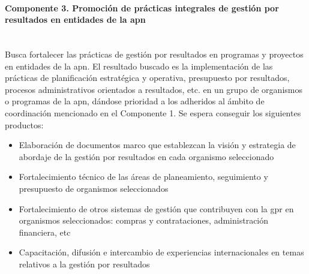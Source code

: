 \paragraph{Componente 3. Promoción de prácticas integrales de gestión por resultados en entidades de la \ac{apn}} \mbox{}\\

Busca fortalecer las prácticas de gestión por resultados en programas y proyectos en entidades de la \ac{apn}. El resultado buscado es la implementación de las prácticas de planificación estratégica y operativa, presupuesto por resultados, procesos administrativos orientados a resultados, etc. en un grupo de organismos o programas de la \ac{apn}, dándose prioridad a los adheridos al ámbito de coordinación mencionado en el Componente 1. Se espera conseguir los siguientes productos:

    \begin{itemize}
        \item Elaboración de documentos marco que establezcan la visión y estrategia de abordaje de la gestión por resultados en cada organismo seleccionado 
        \item Fortalecimiento técnico de las áreas de planeamiento, seguimiento y presupuesto de organismos seleccionados 
        \item Fortalecimiento de otros sistemas de gestión que contribuyen con la \ac{gpr} en organismos seleccionados: compras y contrataciones, administración financiera, etc
        \item Capacitación, difusión e intercambio de experiencias internacionales en temas relativos a la gestión por resultados 
    \end{itemize}
